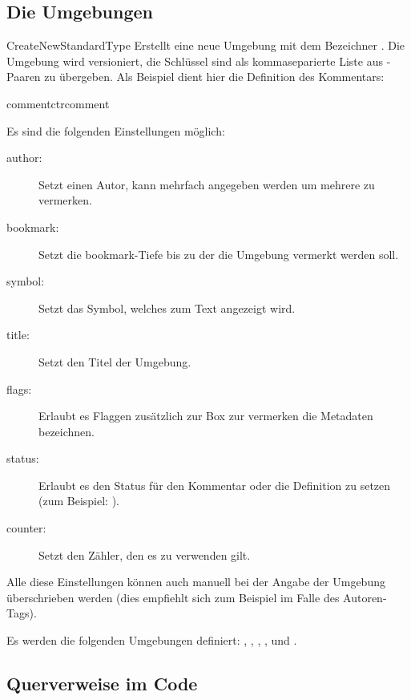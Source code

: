 \documentclass{sopra-base}
\begin{document}
\subsection{Die Umgebungen}
\begin{command}{CreateNewStandardType}{}
    Erstellt eine neue Umgebung mit dem Bezeichner . Die Umgebung wird versioniert, die Schlüssel sind als kommaseparierte Liste aus -Paaren zu übergeben. Als Beispiel dient hier die Definition
    des Kommentars:
\begin{plainlatex}[morekeywords={[5]{\\CreateNewStandardType,\\footnotesize,\\faCommentsO}}]
    {comment}{ctrcomment}
\end{plainlatex}
Es sind die folgenden Einstellungen möglich: \begin{description}
    \item[author:] Setzt einen Autor, kann mehrfach angegeben werden um mehrere zu vermerken.
    \item[bookmark:] Setzt die bookmark-Tiefe bis zu der die Umgebung vermerkt werden soll.
    \item[symbol:] Setzt das Symbol, welches zum Text angezeigt wird.
    \item[title:] Setzt den Titel der Umgebung.
    \item[flags:] Erlaubt es Flaggen zusätzlich zur Box zur vermerken die Metadaten bezeichnen.
    \item[status:] Erlaubt es den Status für den Kommentar oder die Definition zu setzen (zum Beispiel: ).
    \item[counter:] Setzt den Zähler, den es zu verwenden gilt.
\end{description}
Alle diese Einstellungen können auch manuell bei der Angabe der Umgebung überschrieben werden (dies empfiehlt sich zum Beispiel im Falle des Autoren-Tags).
\end{command}

Es werden die folgenden Umgebungen definiert: , , , ,  und .

\subsection{Querverweise im Code}
\end{document}

